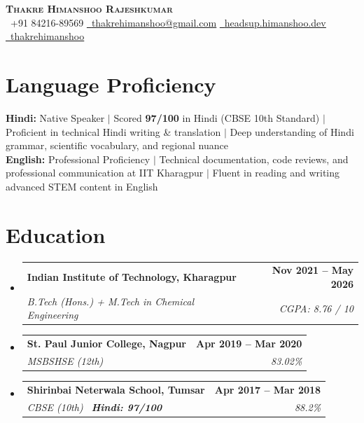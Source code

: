 \documentclass[letterpaper,11pt]{article}
\makeatletter
\newcommand{\resumeSubheading}[4]{
  \vspace{-2pt}\item
    \begin{tabular*}{1.0\textwidth}[t]{l@{\extracolsep{\fill}}r}
      \textbf{#1} & \textbf{\small #2} \\
      \textit{\small#3} & \textit{\small #4} \\
    \end{tabular*}\vspace{-7pt}
}
\newcommand{\resumeSubHeadingListStart}{\begin{itemize}[leftmargin=0.0in, label={}]}
\newcommand{\resumeSubHeadingListEnd}{\end{itemize}}
\makeatother
\begin{document}
\begin{center}
    \textbf{\Huge \scshape Thakre Himanshoo Rajeshkumar} \\ \vspace{4pt}
    \small
    \raisebox{-0.1\height}\faPhone\ +91 84216-89569 \quad
    \href{mailto:thakrehimanshoo@gmail.com}{\raisebox{-0.2\height}\faEnvelope\ \underline{thakrehimanshoo@gmail.com}} \quad
    \href{https://headsup.himanshoo.dev}{\raisebox{-0.2\height}\faGlobe\ \underline{headsup.himanshoo.dev}} \quad
    \href{https://www.linkedin.com/in/thakrehimanshoo/}{\raisebox{-0.2\height}\faLinkedin\ \underline{thakrehimanshoo}}
    \vspace{-6pt}
\end{center}

\section{Language Proficiency}
\begin{itemize}[leftmargin=0.15in, label={}]
  \small{\item{
    \textbf{Hindi:} Native Speaker $|$ Scored \textbf{97/100} in Hindi (CBSE 10th Standard) $|$
    Proficient in technical Hindi writing \& translation $|$ Deep understanding of Hindi grammar,
    scientific vocabulary, and regional nuance \\[3pt]
    \textbf{English:} Professional Proficiency $|$ Technical documentation, code reviews, and professional
    communication at IIT Kharagpur $|$ Fluent in reading and writing advanced STEM content in English
  }}
\end{itemize}

\section{Education}
  \resumeSubHeadingListStart
    \resumeSubheading
      {Indian Institute of Technology, Kharagpur}{Nov 2021 -- May 2026}
      {B.Tech (Hons.) + M.Tech in Chemical Engineering}{CGPA: 8.76 / 10}
    \resumeSubheading
      {St. Paul Junior College, Nagpur}{Apr 2019 -- Mar 2020}
      {MSBSHSE (12th)}{83.02\%}
    \resumeSubheading
      {Shirinbai Neterwala School, Tumsar}{Apr 2017 -- Mar 2018}
      {CBSE (10th) \textemdash\ \textbf{Hindi: 97/100}}{88.2\%}
  \resumeSubHeadingListEnd

\end{document}
